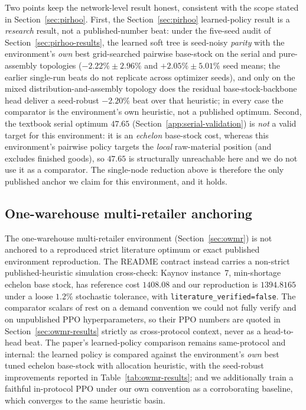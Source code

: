 \documentclass[11pt]{article}
\begin{document}
Two points keep the network-level result honest, consistent with the scope stated in
Section~\ref{sec:pirhoo}. First, the Section~\ref{sec:pirhoo} learned-policy result is a
\emph{research} result, not a
published-number beat: under the five-seed audit of Section~\ref{sec:pirhoo-results}, the learned soft
tree is seed-noisy \emph{parity} with the environment's \emph{own} best grid-searched pairwise
base-stock on the serial and pure-assembly topologies ($-2.22\%\pm2.96\%$ and $+2.05\%\pm5.01\%$ seed
means; the earlier single-run beats do not replicate across optimizer seeds), and only on the mixed
distribution-and-assembly topology does the residual base-stock-backbone head deliver a seed-robust
$-2.20\%$ beat over that heuristic; in every case the comparator is the environment's own heuristic,
not a published optimum. Second, the textbook serial optimum $47.65$
(Section~\ref{app:serial-validation}) is \emph{not} a valid target for this environment: it is an
\emph{echelon} base-stock cost, whereas this environment's pairwise policy targets the \emph{local}
raw-material position (and excludes finished goods), so $47.65$ is structurally unreachable here and we
do not use it as a comparator. The single-node reduction above is therefore the only published anchor
we claim for this environment, and it holds.

\subsection{One-warehouse multi-retailer anchoring}
\label{app:owmr-validation}

The one-warehouse multi-retailer environment (Section~\ref{sec:owmr}) is not anchored to a reproduced
strict literature optimum or exact published environment reproduction. The README contract instead
carries a non-strict published-heuristic simulation cross-check: Kaynov instance~7, min-shortage
echelon base stock, has reference cost $1408.08$ and our reproduction is $1394.8165$ under a loose
$1.2\%$ stochastic tolerance, with \texttt{literature\_verified=false}. The comparator scalars of
\citet{kaynov2024owmr} rest on a demand convention we could not fully verify and on unpublished PPO
hyperparameters, so their PPO numbers are quoted in Section~\ref{sec:owmr-results} strictly as
cross-protocol context, never as a head-to-head beat. The paper's learned-policy comparison remains
same-protocol and internal: the learned policy is compared against the environment's \emph{own} best
tuned echelon base-stock with allocation heuristic, with the seed-robust improvements reported in
Table~\ref{tab:owmr-results}; and we additionally train a faithful in-protocol PPO under our own
convention as a corroborating baseline, which converges to the same heuristic basin.
\end{document}
